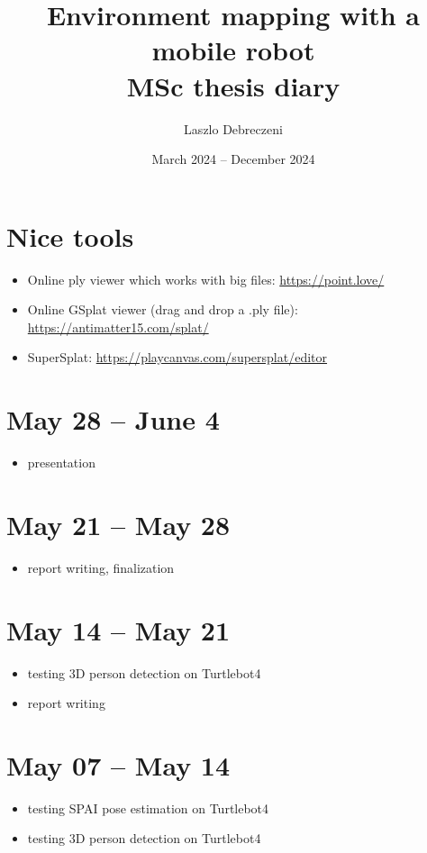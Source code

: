 \documentclass{article}
\title{Environment mapping with a mobile robot \\
\Large MSc thesis diary}
\author{Laszlo Debreczeni}
\date{March 2024 -- December 2024}
\begin{document}
\maketitle

\tableofcontents
\newpage

\section{Nice tools}
\begin{itemize}
    \item Online ply viewer which works with big files: \url{https://point.love/}
    \item Online GSplat viewer (drag and drop a .ply file): \url{https://antimatter15.com/splat/}
    \item SuperSplat: \url{https://playcanvas.com/supersplat/editor}
\end{itemize}

\section{May 28 -- June 4}
\begin{itemize}
\item presentation
\end{itemize}

\section{May 21 -- May 28}
\begin{itemize}
\item report writing, finalization
\end{itemize}

\section{May 14 -- May 21}
\begin{itemize}
\item testing 3D person detection on Turtlebot4
\item report writing
\end{itemize}


\section{May 07 -- May 14}
\begin{itemize}
\item testing SPAI pose estimation on Turtlebot4
\item testing 3D person detection on Turtlebot4
\end{itemize}
\newpage
\end{document}

